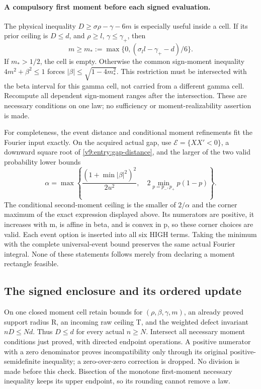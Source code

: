 \paragraph{A compulsory first moment before each signed evaluation.}
The physical inequality $D\ge\sigma\rho-\gamma-6m$ is especially
useful inside a cell. If its prior ceiling is $D\le d$, and
$\rho\ge l$, $\gamma\le\gamma_+$, then
\begin{equation}\label{v9:entry:mean-contraction}
 m\ge m_*:=\max\{0,(\sigma_l l-\gamma_+-d)/6\}.
\end{equation}
If $m_*>1/2$, the cell is empty. Otherwise the common sign-moment
inequality $4m^2+\beta^2\le1$ forces
$|\beta|\le\sqrt{1-4m_*^2}$. This restriction must be intersected
with the beta interval for this gamma cell, not carried from a different
gamma cell. Recompute all dependent sign-moment ranges after the
intersection. These are necessary conditions on one law; no sufficiency
or moment-realizability assertion is made.

For completeness, the event distance and conditional moment refinements
fit the Fourier input exactly. On the acquired actual gap, use
$\mathcal E=\{XX'<0\}$, a downward square root of
\eqref{v9:entry:gap-distance}, and the larger of the two valid probability
lower bounds
\[
 \alpha=\max\left\{
 \frac{(1+\min|\beta|^2)^2}{2u^2},\quad
 2\min_{p=p_-,p_+}p(1-p)\right\}.
\]
The conditional second-moment ceiling is the smaller of $2/\alpha$ and
the corner maximum of the exact expression displayed above. Its
numerators are positive, it increases with m, is affine in beta, and
is convex in p, so these corner choices are valid. Each event option
is inserted into all six HIGH terms. Taking the minimum with the
complete universal-event bound preserves the same actual Fourier
integral. None of these statements follows merely from declaring a
moment rectangle feasible.

\subsection{The signed enclosure and its ordered update}
\label{v9:entry:ordered-update}
On one closed moment cell retain bounds for
$(\rho,\beta,\gamma,m)$, an already proved support radius R, an incoming
raw ceiling T, and the weighted defect invariant $nD\le Nd$.
Thus $D\le d$ for every actual $n\ge N$. Intersect all necessary
moment conditions just proved, with directed endpoint operations.
A positive numerator with a zero denominator proves incompatibility
only through its original positive-semidefinite inequality; a
zero-over-zero correction is dropped. No division is made before this
check. Bisection of the monotone first-moment necessary inequality
keeps its upper endpoint, so its rounding cannot remove a law.

